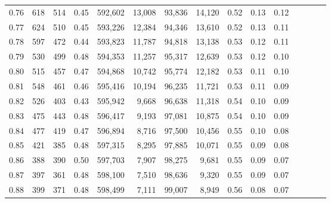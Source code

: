 \begin{tabular}{rrrcrrrrrrrrrrr}
0.76 &     618 &    514 &                                       0.45 &  592,602 &   13,008 &   93,836 &   14,120 &  0.52 &  0.13 &                         0.12 \\
0.77 &     624 &    510 &                                       0.45 &  593,226 &   12,384 &   94,346 &   13,610 &  0.52 &  0.13 &                         0.11 \\
0.78 &     597 &    472 &                                       0.44 &  593,823 &   11,787 &   94,818 &   13,138 &  0.53 &  0.12 &                         0.11 \\
0.79 &     530 &    499 &                                       0.48 &  594,353 &   11,257 &   95,317 &   12,639 &  0.53 &  0.12 &                         0.10 \\
0.80 &     515 &    457 &                                       0.47 &  594,868 &   10,742 &   95,774 &   12,182 &  0.53 &  0.11 &                         0.10 \\
0.81 &     548 &    461 &                                       0.46 &  595,416 &   10,194 &   96,235 &   11,721 &  0.53 &  0.11 &                         0.09 \\
0.82 &     526 &    403 &                                       0.43 &  595,942 &    9,668 &   96,638 &   11,318 &  0.54 &  0.10 &                         0.09 \\
0.83 &     475 &    443 &                                       0.48 &  596,417 &    9,193 &   97,081 &   10,875 &  0.54 &  0.10 &                         0.09 \\
0.84 &     477 &    419 &                                       0.47 &  596,894 &    8,716 &   97,500 &   10,456 &  0.55 &  0.10 &                         0.08 \\
0.85 &     421 &    385 &                                       0.48 &  597,315 &    8,295 &   97,885 &   10,071 &  0.55 &  0.09 &                         0.08 \\
0.86 &     388 &    390 &                                       0.50 &  597,703 &    7,907 &   98,275 &    9,681 &  0.55 &  0.09 &                         0.07 \\
0.87 &     397 &    361 &                                       0.48 &  598,100 &    7,510 &   98,636 &    9,320 &  0.55 &  0.09 &                         0.07 \\
0.88 &     399 &    371 &                                       0.48 &  598,499 &    7,111 &   99,007 &    8,949 &  0.56 &  0.08 &                         0.07 \\

\end{tabular}
